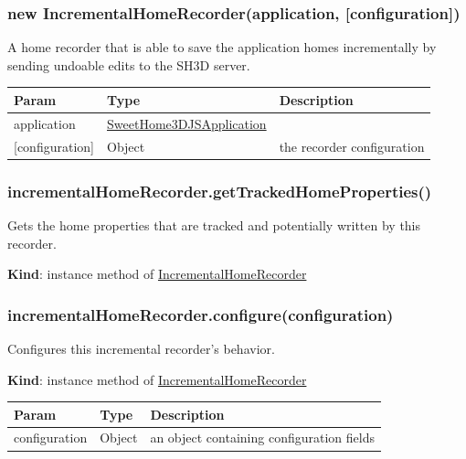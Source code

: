 \documentclass[a4paper]{report}
\begin{document}
\hypertarget{new-incrementalhomerecorderapplication-configuration}{%
\subsubsection{new IncrementalHomeRecorder(application,
{[}configuration{]})}\label{new-incrementalhomerecorderapplication-configuration}}

A home recorder that is able to save the application homes incrementally
by sending undoable edits to the SH3D server.

\begin{longtable}[]{@{}lll@{}}
\toprule
Param & Type & Description\tabularnewline
\midrule
\endhead
application &
\protect\hyperlink{SweetHome3DJSApplication}{SweetHome3DJSApplication}
&\tabularnewline
{[}configuration{]} & Object & the recorder configuration\tabularnewline
\bottomrule
\end{longtable}

\hypertarget{incrementalhomerecorder.gettrackedhomeproperties}{%
\subsubsection{incrementalHomeRecorder.getTrackedHomeProperties()}\label{incrementalhomerecorder.gettrackedhomeproperties}}

Gets the home properties that are tracked and potentially written by
this recorder.

\textbf{Kind}: instance method of
\protect\hyperlink{IncrementalHomeRecorder}{IncrementalHomeRecorder}\\

\hypertarget{incrementalhomerecorder.configureconfiguration}{%
\subsubsection{incrementalHomeRecorder.configure(configuration)}\label{incrementalhomerecorder.configureconfiguration}}

Configures this incremental recorder's behavior.

\textbf{Kind}: instance method of
\protect\hyperlink{IncrementalHomeRecorder}{IncrementalHomeRecorder}

\begin{longtable}[]{@{}lll@{}}
\toprule
Param & Type & Description\tabularnewline
\midrule
\endhead
configuration & Object & an object containing configuration
fields\tabularnewline
\bottomrule
\end{longtable}
\end{document}
